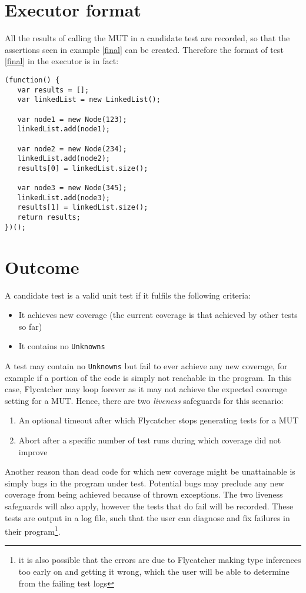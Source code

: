 \section{Executor format}

All the results of calling the MUT in a candidate test are recorded, so that the assertions seen in example \ref{final} can be created. Therefore the format of test \ref{final} in the executor is in fact:

\begin{lstlisting}
(function() {
   var results = [];
   var linkedList = new LinkedList();

   var node1 = new Node(123);
   linkedList.add(node1);

   var node2 = new Node(234);
   linkedList.add(node2);
   results[0] = linkedList.size();

   var node3 = new Node(345);
   linkedList.add(node3);
   results[1] = linkedList.size();
   return results;
})();
\end{lstlisting}

\section{Outcome}

A candidate test is a valid unit test if it fulfils the following criteria:

\begin{itemize}
   \item It achieves new coverage (the current coverage is that achieved by other tests so far)
   \item It contains no \texttt{Unknowns}
\end{itemize}

A test may contain no \texttt{Unknowns} but fail to ever achieve any new coverage, for example if a portion of the code is simply not reachable in the program. In this case, \textsf{Flycatcher} may loop forever as it may not achieve the expected coverage setting for a MUT. Hence, there are two \emph{liveness} safeguards for this scenario:

\begin{enumerate}
   \item An optional timeout after which \textsf{Flycatcher} stops generating tests for a MUT
   \item Abort after a specific number of test runs during which coverage did not improve
\end{enumerate}

Another reason than dead code for which new coverage might be unattainable is simply bugs in the program under test. Potential bugs may preclude any new coverage from being achieved because of thrown exceptions. The two liveness safeguards will also apply, however the tests that do fail will be recorded. These tests are output in a log file, such that the user can diagnose and fix failures in their program\footnote{it is also possible that the errors are due to \textsf{Flycatcher} making type inferences too early on and getting it wrong, which the user will be able to determine from the failing test logs}.

